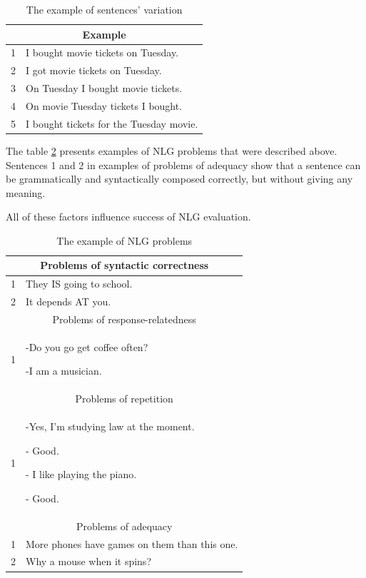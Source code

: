 \begin{table}[t]
\centering
 \begin{tabular}{|p{0.5cm}|p{8cm}|} 
 \hline
 \multicolumn{2}{|c|}{Example} \\
 \hline
 1 & I bought movie tickets on Tuesday. \\ 
 \hline
 2 & I got movie tickets on Tuesday. \\
 \hline
 3 & On Tuesday I bought movie tickets. \\
 \hline
 4 & On movie Tuesday tickets I bought. \\
 \hline
 5 & I bought tickets for the Tuesday movie. \\ 
 \hline
 \end{tabular}
 \caption{The example of sentences' variation}
\label{tab:var_example}
\end{table}

The table \ref{tab:nlg_problems_example} presents examples of NLG problems that were described above. Sentences 1 and 2 in examples of problems of adequacy show that a sentence can be grammatically and syntactically composed correctly, but without giving any meaning. 

All of these factors influence success of NLG evaluation.  

\begin{table}[t]
\centering
 \begin{tabular}{|p{0.5cm}|p{8cm}|} 
 \hline
 \multicolumn{2}{|c|}{Problems of syntactic correctness} \\
 \hline
 1 & They IS going to school. \\ 
 \hline
 2 & It depends AT you. \\
 \hline
 \multicolumn{2}{|c|}{Problems of response-relatedness} \\
 \hline
 1 & -Do you go get coffee often? 

    -I am a musician. \\
 \hline
 \multicolumn{2}{|c|}{Problems of repetition} \\
 \hline
 1 & -Yes, I'm studying law at the moment.

     - Good.

     - I like playing the piano.

     - Good. \\
 \hline
 \multicolumn{2}{|c|}{Problems of adequacy} \\
 \hline
 1 & More phones have games on them than this one. \\
 \hline
 2 & Why a mouse when it spins? \\
 \hline
 \end{tabular}
 \caption{The example of NLG problems}
\label{tab:nlg_problems_example}
\end{table}

